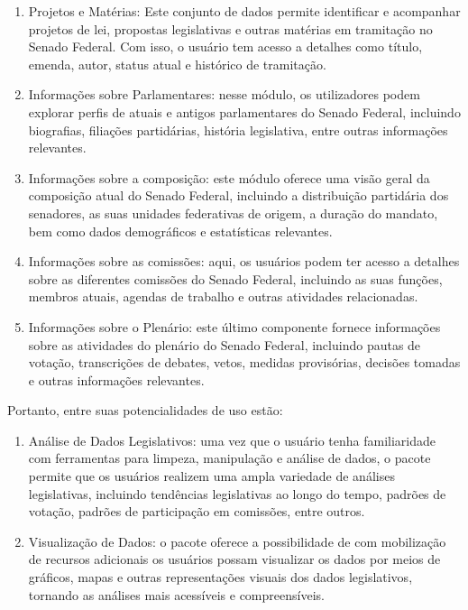 \documentclass{article}
\begin{document}
\begin{enumerate}
\def\labelenumi{\arabic{enumi})}
\item
  Projetos e Matérias: Este conjunto de dados permite identificar e
  acompanhar projetos de lei, propostas legislativas e outras matérias
  em tramitação no Senado Federal. Com isso, o usuário tem acesso a
  detalhes como título, emenda, autor, status atual e histórico de
  tramitação.
\item
  Informações sobre Parlamentares: nesse módulo, os utilizadores podem
  explorar perfis de atuais e antigos parlamentares do Senado Federal,
  incluindo biografias, filiações partidárias, história legislativa,
  entre outras informações relevantes.
\item
  Informações sobre a composição: este módulo oferece uma visão geral da
  composição atual do Senado Federal, incluindo a distribuição
  partidária dos senadores, as suas unidades federativas de origem, a
  duração do mandato, bem como dados demográficos e estatísticas
  relevantes.
\item
  Informações sobre as comissões: aqui, os usuários podem ter acesso a
  detalhes sobre as diferentes comissões do Senado Federal, incluindo as
  suas funções, membros atuais, agendas de trabalho e outras atividades
  relacionadas.
\item
  Informações sobre o Plenário: este último componente fornece
  informações sobre as atividades do plenário do Senado Federal,
  incluindo pautas de votação, transcrições de debates, vetos, medidas
  provisórias, decisões tomadas e outras informações relevantes.
\end{enumerate}

Portanto, entre suas potencialidades de uso estão:

\begin{enumerate}
\def\labelenumi{\arabic{enumi})}
\item
  Análise de Dados Legislativos: uma vez que o usuário tenha
  familiaridade com ferramentas para limpeza, manipulação e análise de
  dados, o pacote permite que os usuários realizem uma ampla variedade
  de análises legislativas, incluindo tendências legislativas ao longo
  do tempo, padrões de votação, padrões de participação em comissões,
  entre outros.
\item
  Visualização de Dados: o pacote oferece a possibilidade de com
  mobilização de recursos adicionais os usuários possam visualizar os
  dados por meios de gráficos, mapas e outras representações visuais dos
  dados legislativos, tornando as análises mais acessíveis e
  compreensíveis.
\end{enumerate}
\end{document}
